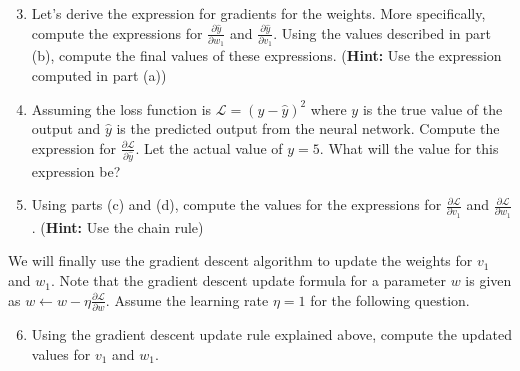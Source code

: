 \begin{enumerate}
    \setcounter{enumi}{2}
    \item {} Let's derive the expression for gradients for the weights. More specifically, compute the expressions for $\frac{\partial \hat{y}}{\partial w_1}$ and $\frac{\partial \hat{y}}{\partial v_1}$. Using the values described in part (b), compute the final values of these expressions. (\textbf{Hint:} Use the expression computed in part (a))
    
    
    
    \item {} Assuming the loss function is $\mathcal{L} = (y - \hat{y})^2$ where $y$ is the true value of the output and $\hat{y}$ is the predicted output from the neural network. Compute the expression for  $\frac{\partial \mathcal{L}}{\partial \hat{y}}$. Let the actual value of $y = 5$. What will the value for this expression be?
    
    
    
    \item {} Using parts (c) and (d), compute the values for the expressions for $\frac{\partial \mathcal{L}}{\partial v_1}$ and $\frac{\partial \mathcal{L}}{\partial w_1}$. (\textbf{Hint:} Use the chain rule)
    
    
\end{enumerate}

We will finally use the gradient descent algorithm to update the weights for $v_1$ and $w_1$. Note that the gradient descent update formula for a parameter $w$ is given as $w \leftarrow w - \eta \frac{\partial \mathcal{L}}{\partial w}$. Assume the learning rate $\eta = 1$ for the following question.

\begin{enumerate}
    \setcounter{enumi}{5}
    \item {} Using the gradient descent update rule explained above, compute the updated values for $v_1$ and $w_1$.
    
    
\end{enumerate}